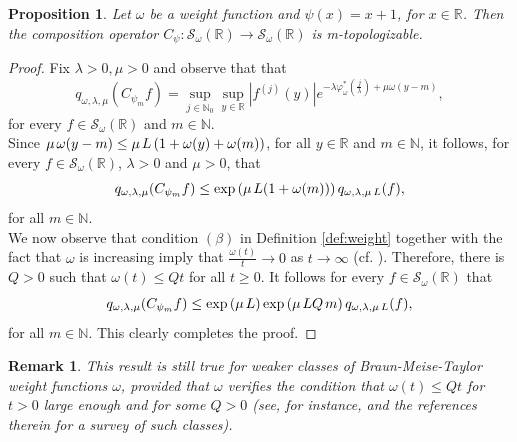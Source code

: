 \documentclass[12pt,reqno]{amsart} %
\newtheorem{remark}[theorem]{Remark}
\newtheorem{prop}[theorem]{Proposition}
\numberwithin{equation}{section}
\begin{document}
			
			\begin{prop}\label{toptrans}
				Let $\omega$ be a weight function and $\psi(x)=x+1$, for  $x\in\mathbb{R}$. Then the composition operator $C_\psi: \mathcal{S}_{\omega}(\mathbb{R})\to \mathcal{S}_{\omega}(\mathbb{R})$ is m-topologizable.
			\end{prop}
			\begin{proof} Fix $\lambda > 0, \mu > 0$ and observe that  that $$q_{\omega,\lambda, \mu}(C_{\psi_m}f)%
				=\sup_{j\in {\mathbb N}_0}\sup_{y\in {\mathbb R}} |f^{(j)}(y)| e^{-\lambda\varphi_\omega^\ast(\frac{j}{\lambda}) + \mu\omega(y-m)},
				$$
				for every $f\in \mathcal{S}_{\omega}(\mathbb{R})$ and $m\in\mathbb{N}$.\\
				
				Since $\mu\hspace{0.05cm} \omega(y-m)\leq \mu\hspace{0.05cm} L\left(1+\omega(y)+\omega(m)\right)$, for all $y\in\mathbb{R}$ and $m\in\mathbb{N}$, it follows, for every $f\in\mathcal{S}_{\omega}(\mathbb{R})$, $\lambda>0$ and $\mu>0$, that 
				$$
				q_{\omega, \lambda, \mu}(C_{\psi_m}f)\leq \exp\left(\mu\hspace{0.05cm} L (1+\omega(m))\right)q_{\omega,\lambda,\mu\hspace{0.05cm} L}(f),
				$$
				for all $m\in\mathbb{N}$.\\
				
				We now observe that condition $(\beta)$ in Definition \ref{def:weight} together with the fact that $\omega$ is increasing imply  that $\frac{\omega(t)}{t}\to 0$ as $t\to \infty$ (cf. \cite[1.2.Remark(b)]{mt}). 
					Therefore, there is $Q>0$ such that $\omega(t)\leq Q t$ for all $t\geq 0$. It follows for every $f\in\mathcal{S}_{\omega}(\mathbb{R})$ that
					$$
					q_{\omega,\lambda, \mu}(C_{\psi_m}f)\leq \exp\left(\mu\hspace{0.05cm} L\right)\exp\left(\mu\hspace{0.05cm} L Q \hspace{0.05cm} m\right)q_{\omega,\lambda,\mu\hspace{0.05cm} L}(f),$$ 
					for all $m\in\mathbb{N}$. This clearly completes the proof.
				\end{proof}
				
				\begin{remark}
					This result is still true for weaker classes of Braun-Meise-Taylor weight functions $\omega$, provided that $\omega$ verifies the condition that $\omega(t)\leq Q t$ for  $t>0$ large enough and for some $Q>0$ (see, for instance, \cite{Schindl} and the references therein for a survey of such classes). 
				\end{remark}
				
\end{document}
